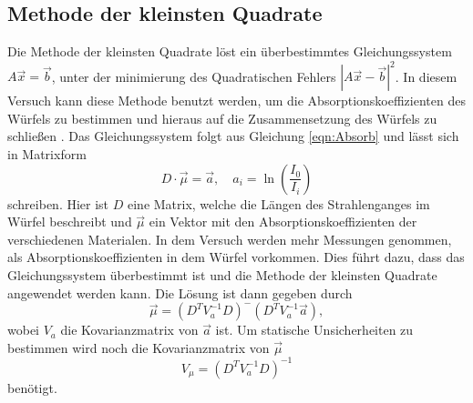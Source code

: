 \subsection{Methode der kleinsten Quadrate}
Die Methode der kleinsten Quadrate löst ein überbestimmtes Gleichungssystem $A\vec{x} = \vec{b}$, unter der minimierung des Quadratischen Fehlers $ |A\vec{x} -\vec{b}|^2$. In diesem Versuch kann diese Methode benutzt werden, um die Absorptionskoeffizienten des Würfels zu bestimmen und hieraus auf die Zusammensetzung des Würfels zu schließen . 
Das Gleichungssystem folgt aus Gleichung \ref{eqn:Absorb} und lässt sich in Matrixform
\begin{equation*}
    D \cdot \vec{\mu} = \vec{a} , \quad a_i = \ln \left(\frac{I_0}{I_i} \right)
\end{equation*}
schreiben.
Hier ist $D$ eine Matrix, welche die Längen des Strahlenganges im Würfel beschreibt und $\vec{\mu}$ ein Vektor mit den Absorptionskoeffizienten der verschiedenen Materialen.
In dem Versuch werden mehr Messungen genommen, als Absorptionskoeffizienten in dem Würfel vorkommen. Dies führt dazu, dass das Gleichungssystem überbestimmt ist und die Methode der kleinsten Quadrate angewendet werden kann.
Die Lösung\cite{stat} ist dann gegeben durch 
\begin{equation}
    \label{eq:mu}
    \vec{\mu} = \left(D^T V_a^{-1} D \right)^- \left( D^T V_a^{-1} \vec{a}\right),
\end{equation}
wobei $V_a$ die Kovarianzmatrix von $\vec{a}$ ist.
Um statische Unsicherheiten zu bestimmen wird noch die Kovarianzmatrix\cite{stat} von $\vec{\mu}$
\begin{equation*}
    V_{\mu} = \left(D^T V_a^{-1} D \right)^{-1}
\end{equation*}
benötigt.
